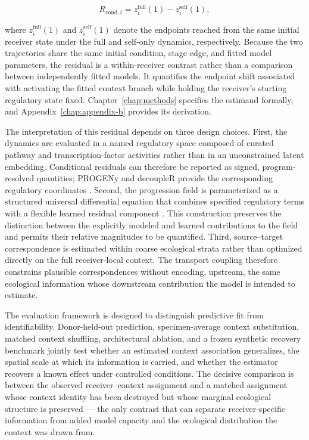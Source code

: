 \begin{equation}
R_{\mathrm{cond},i}
=
z_i^{\mathrm{full}}(1)
-
z_i^{\mathrm{self}}(1),
\label{eq:intro-context-residual}
\end{equation}

where $z_i^{\mathrm{full}}(1)$ and $z_i^{\mathrm{self}}(1)$ denote the
endpoints reached from the same initial receiver state under the full and
self-only dynamics, respectively. Because the two trajectories share the same
initial condition, stage edge, and fitted model parameters, the residual is a
within-receiver contrast rather than a comparison between independently
fitted models. It quantifies the endpoint shift associated with activating
the fitted context branch while holding the receiver's starting regulatory
state fixed. Chapter~\ref{chap:methods} specifies the estimand formally, and
Appendix~\ref{chap:appendix-b} provides its derivation.

The interpretation of this residual depends on three design choices. First,
the dynamics are evaluated in a named regulatory space composed of curated
pathway and transcription-factor activities rather than in an unconstrained
latent embedding. Conditional residuals can therefore be reported as signed,
program-resolved quantities; PROGENy and decoupleR provide the corresponding
regulatory coordinates \autocite{Schubert2018-ph,Badia-I-Mompel2022-te}.
Second, the progression field is parameterized as a structured universal
differential equation that combines specified regulatory terms with a
flexible learned residual component \autocite{Rackauckas2020-mc,Philipps2025-jl}.
This construction preserves the distinction between the explicitly modeled
and learned contributions to the field and permits their relative magnitudes
to be quantified. Third, source--target correspondence is estimated within
coarse ecological strata rather than optimized directly on the full
receiver-local context. The transport coupling therefore constrains
plausible correspondences without encoding, upstream, the same ecological
information whose downstream contribution the model is intended to estimate.

The evaluation framework is designed to distinguish predictive fit from
identifiability. Donor-held-out prediction, specimen-average context
substitution, matched context shuffling, architectural ablation, and a
frozen synthetic recovery benchmark jointly test whether an estimated context
association generalizes, the spatial scale at which its information is
carried, and whether the estimator recovers a known effect under controlled
conditions. The decisive comparison is between the observed
receiver--context assignment and a matched assignment whose context identity
has been destroyed but whose marginal ecological structure is preserved ---
the only contrast that can separate receiver-specific information from added
model capacity and the ecological distribution the context was drawn from.

